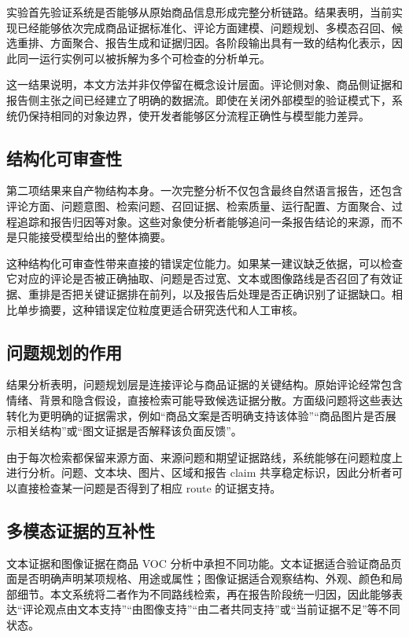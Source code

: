 \documentclass[11pt]{article}
\begin{document}
实验首先验证系统是否能够从原始商品信息形成完整分析链路。结果表明，当前实现已经能够依次完成商品证据标准化、评论方面建模、问题规划、多模态召回、候选重排、方面聚合、报告生成和证据归因。各阶段输出具有一致的结构化表示，因此同一运行实例可以被拆解为多个可检查的分析单元。

这一结果说明，本文方法并非仅停留在概念设计层面。评论侧对象、商品侧证据和报告侧主张之间已经建立了明确的数据流。即使在关闭外部模型的验证模式下，系统仍保持相同的对象边界，使开发者能够区分流程正确性与模型能力差异。

\subsection{结构化可审查性}

第二项结果来自产物结构本身。一次完整分析不仅包含最终自然语言报告，还包含评论方面、问题意图、检索问题、召回证据、检索质量、运行配置、方面聚合、过程追踪和报告归因等对象。这些对象使分析者能够追问一条报告结论的来源，而不是只能接受模型给出的整体摘要。

这种结构化可审查性带来直接的错误定位能力。如果某一建议缺乏依据，可以检查它对应的评论是否被正确抽取、问题是否过宽、文本或图像路线是否召回了有效证据、重排是否把关键证据排在前列，以及报告后处理是否正确识别了证据缺口。相比单步摘要，这种错误定位粒度更适合研究迭代和人工审核。

\subsection{问题规划的作用}

结果分析表明，问题规划层是连接评论与商品证据的关键结构。原始评论经常包含情绪、背景和隐含假设，直接检索可能导致候选证据分散。方面级问题将这些表达转化为更明确的证据需求，例如``商品文案是否明确支持该体验''``商品图片是否展示相关结构''或``图文证据是否解释该负面反馈''。

由于每次检索都保留来源方面、来源问题和期望证据路线，系统能够在问题粒度上进行分析。问题、文本块、图片、区域和报告 claim 共享稳定标识，因此分析者可以直接检查某一问题是否得到了相应 route 的证据支持。

\subsection{多模态证据的互补性}

文本证据和图像证据在商品 VOC 分析中承担不同功能。文本证据适合验证商品页面是否明确声明某项规格、用途或属性；图像证据适合观察结构、外观、颜色和局部细节。本文系统将二者作为不同路线检索，再在报告阶段统一归因，因此能够表达``评论观点由文本支持''``由图像支持''``由二者共同支持''或``当前证据不足''等不同状态。
\end{document}

